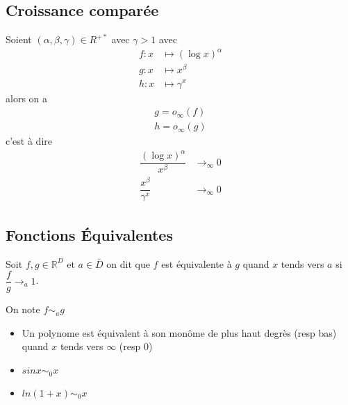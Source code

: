 \documentclass[11pt,colorlinks]{book}
\theoremstyle{mytheoremstyle}
\theoremstyle{mytheoremstyle}
\theoremstyle{mytheoremstyle}
\theoremstyle{mytheoremstyle}
\theoremstyle{mytheoremstyle}
\theoremstyle{mytheoremstyle}
\theoremstyle{mytheoremstyle}
\theoremstyle{mytheoremstyle}
\theoremstyle{myproblemstyle}
\def\mbb#1{\mathbb{#1}}
\def\bR{\mbb{R}}
\renewcommand{\equiv}{\sim}
\begin{document}
    \subsection{Croissance comparée}
    \begin{theorem}
      Soient $(\alpha,\beta,\gamma) \in R^{+*}$ avec $\gamma > 1$ avec 
      \begin{align*}
        f : x &\mapsto (\log x)^{\alpha} \\ 
        g : x &\mapsto x^{\beta} \\ 
        h : x &\mapsto \gamma^{x}
      \end{align*} 
      alors on a 
      \begin{align*}
        g = o_{\infty}(f) \\ 
        h = o_{\infty}(g)
      \end{align*}
      c'est à dire 
      \begin{align*}
        \dfrac{(\log x)^\alpha}{x^\beta} &\to_{\infty} 0 \\ 
        \dfrac{x^{\beta}}{\gamma^x} &\to_{\infty} 0
      \end{align*}
    \end{theorem}

    \subsection{Fonctions Équivalentes}
    \begin{definition}
      Soit $f,g \in \bR^{D}$ et $a \in \bar{D}$ on dit que $f$ est équivalente à $g$ 
      quand $x$ tends vers $a$ si $\dfrac{f}{g} \to_{a} 1$.  

      On note $f \equiv_a g$ 
    \end{definition}
    \begin{ex}
      \begin{itemize}
        \item Un polynome est équivalent à son monôme de plus haut degrès (resp bas) quand $x$ tends vers $\infty$ (resp $0$)
        \item $sin x \equiv_{0} x$
        \item $ln(1+x) \equiv_{0} x$
      \end{itemize}
    \end{ex}
\end{document}

